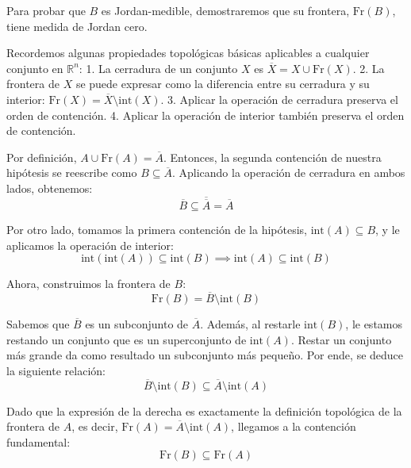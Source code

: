 \documentclass[11pt,letterpaper]{article}
\begin{document}
Para probar que $B$ es Jordan-medible, demostraremos que su frontera, $\text{Fr}(B)$, tiene medida de Jordan cero.

Recordemos algunas propiedades topológicas básicas aplicables a cualquier conjunto en $\mathbb{R}^n$:
1. La cerradura de un conjunto $X$ es $\overline{X} = X \cup \text{Fr}(X)$.
2. La frontera de $X$ se puede expresar como la diferencia entre su cerradura y su interior: $\text{Fr}(X) = \overline{X} \setminus \text{int}(X)$.
3. Aplicar la operación de cerradura preserva el orden de contención.
4. Aplicar la operación de interior también preserva el orden de contención.

Por definición, $A \cup \text{Fr}(A) = \overline{A}$. Entonces, la segunda contención de nuestra hipótesis se reescribe como $B \subseteq \overline{A}$. Aplicando la operación de cerradura en ambos lados, obtenemos:
\begin{equation*}
\overline{B} \subseteq \overline{\overline{A}} = \overline{A}
\end{equation*}

Por otro lado, tomamos la primera contención de la hipótesis, $\text{int}(A) \subseteq B$, y le aplicamos la operación de interior:
\begin{equation*}
\text{int}(\text{int}(A)) \subseteq \text{int}(B) \implies \text{int}(A) \subseteq \text{int}(B)
\end{equation*}

Ahora, construimos la frontera de $B$:
\begin{equation*}
\text{Fr}(B) = \overline{B} \setminus \text{int}(B)
\end{equation*}

Sabemos que $\overline{B}$ es un subconjunto de $\overline{A}$. Además, al restarle $\text{int}(B)$, le estamos restando un conjunto que es un superconjunto de $\text{int}(A)$. Restar un conjunto más grande da como resultado un subconjunto más pequeño. Por ende, se deduce la siguiente relación:
\begin{equation*}
\overline{B} \setminus \text{int}(B) \subseteq \overline{A} \setminus \text{int}(A)
\end{equation*}

Dado que la expresión de la derecha es exactamente la definición topológica de la frontera de $A$, es decir, $\text{Fr}(A) = \overline{A} \setminus \text{int}(A)$, llegamos a la contención fundamental:
\begin{equation*}
\text{Fr}(B) \subseteq \text{Fr}(A)
\end{equation*}
\end{document}

